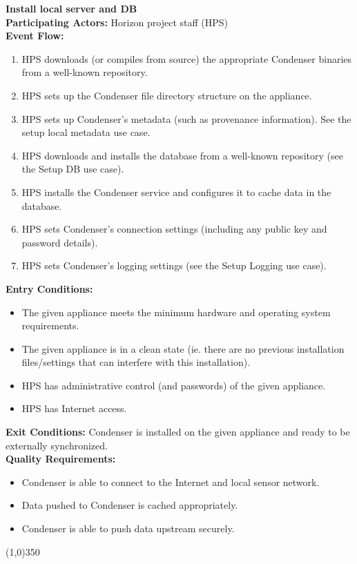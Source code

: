 		\textbf{Install local server and DB}\\	 
		\textbf{Participating Actors:} Horizon project staff (HPS)  \\
		\textbf{Event Flow:}
		\begin{enumerate}
\item HPS downloads (or compiles from source) the appropriate Condenser binaries from a well-known repository.
\item HPS sets up the Condenser file directory structure on the appliance.
\item HPS sets up Condenser's metadata (such as provenance information). See the setup local metadata use case.
\item HPS downloads and installs the database from a well-known repository (see the Setup DB use case).
\item HPS installs the Condenser service and configures it to cache data in the database.
\item HPS sets Condenser's connection settings (including any public key and password details).
\item HPS sets Condenser's logging settings (see the Setup Logging use case).
	    \end{enumerate}
		\textbf{Entry Conditions:}
		\begin{itemize}
\item The given appliance meets the minimum hardware and operating system requirements.
\item The given appliance is in a clean state (ie. there are no previous installation files/settings that can interfere with this installation).
\item HPS has administrative control (and passwords) of the given appliance.
\item HPS has Internet access.
	    \end{itemize}
		\textbf{Exit Conditions:} Condenser is installed on the given appliance and ready to be externally synchronized.\\
		\textbf{Quality Requirements:}
		\begin{itemize}
\item Condenser is able to connect to the Internet and local sensor network.
\item Data pushed to Condenser is cached appropriately.
\item Condenser is able to push data upstream securely.
		\end{itemize}
		\line(1,0){350}		
		
